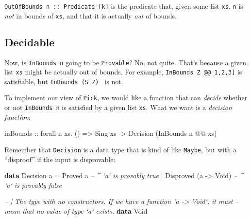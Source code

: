 \documentclass[]{article}
\newenvironment{Shaded}{}{}
\newcommand{\CommentTok}[1]{\textcolor[rgb]{0.38,0.63,0.69}{\textit{#1}}}
\newcommand{\DataTypeTok}[1]{\textcolor[rgb]{0.56,0.13,0.00}{#1}}
\newcommand{\FunctionTok}[1]{\textcolor[rgb]{0.02,0.16,0.49}{#1}}
\newcommand{\KeywordTok}[1]{\textcolor[rgb]{0.00,0.44,0.13}{\textbf{#1}}}
\newcommand{\NormalTok}[1]{#1}
\newcommand{\OtherTok}[1]{\textcolor[rgb]{0.00,0.44,0.13}{#1}}
\begin{document}
\texttt{OutOfBounds\ n\ ::\ Predicate\ {[}k{]}} is the predicate that, given
some list \texttt{xs}, \texttt{n} is \emph{not} in bounds of \texttt{xs}, and
that it is actually \emph{out} of bounds.

\hypertarget{decidable}{%
\subsection{Decidable}\label{decidable}}

Now, is \texttt{InBounds\ n} going to be \texttt{Provable}? No, not quite.
That's because a given list \texttt{xs} might be actually out of bounds. For
example,
\texttt{InBounds\ \textquotesingle{}Z\ @@\ \textquotesingle{}{[}1,2,3{]}} is
satisfiable, but
\texttt{InBounds\ (\textquotesingle{}S\ \textquotesingle{}Z)\ \textquotesingle{}{[}{]}}
is not.

To implement our view of \texttt{Pick}, we would like a function that can
\emph{decide} whether or not \texttt{InBounds\ n} is satisfied by a given list
\texttt{xs}. What we want is a \emph{decision function}:

\begin{Shaded}
\begin{Highlighting}[]
\OtherTok{inBounds ::}\NormalTok{ forall n xs}\FunctionTok{.}\NormalTok{ ()}
         \OtherTok{=>} \DataTypeTok{Sing}\NormalTok{ xs}
         \OtherTok{->} \DataTypeTok{Decision}\NormalTok{ (}\DataTypeTok{InBounds}\NormalTok{ n }\FunctionTok{@@}\NormalTok{ xs)}
\end{Highlighting}
\end{Shaded}

Remember that \texttt{Decision} is a data type that is kind of like
\texttt{Maybe}, but with a ``disproof'' if the input is disprovable:

\begin{Shaded}
\begin{Highlighting}[]
\KeywordTok{data} \DataTypeTok{Decision}\NormalTok{ a}
    \FunctionTok{=} \DataTypeTok{Proved}\NormalTok{     a                }\CommentTok{-- ^ `a` is provably true}
    \FunctionTok{|} \DataTypeTok{Disproved}\NormalTok{ (a }\OtherTok{->} \DataTypeTok{Void}\NormalTok{)       }\CommentTok{-- ^ `a` is provably false}

\CommentTok{-- | The type with no constructors.  If we have a function `a -> Void`, it must}
\CommentTok{-- mean that no value of type `a` exists.}
\KeywordTok{data} \DataTypeTok{Void}
\end{Highlighting}
\end{Shaded}
\end{document}
